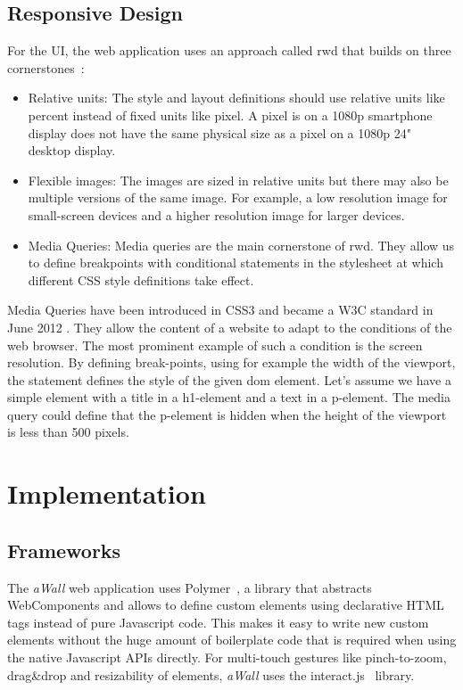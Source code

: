 \documentclass{sigchi}
\begin{document}
\subsection{Responsive Design}
For the UI, the web application uses an approach called \gls{rwd} that builds on three cornerstones~\cite{Marcotte:2011}:
\begin{itemize}
	\item Relative units: The style and layout definitions should use relative units like percent instead of fixed units like pixel. A pixel is on a 1080p smartphone display does not have the same physical size as a pixel on a 1080p 24" desktop display. 
	
	\item Flexible images: The images are sized in relative units but there may also be multiple versions of the same image. For example, a low resolution image for small-screen devices and a higher resolution image for larger devices.
	
	\item Media Queries: Media queries are the main cornerstone of \gls{rwd}. They allow us to define breakpoints with conditional statements in the stylesheet at which different CSS style definitions take effect.
\end{itemize}

Media Queries have been introduced in CSS3 and became a W3C standard in June 2012 \cite{mediaqueriesW3C}.
They allow the content of a website to adapt to the conditions of the web browser.
The most prominent example of such a condition is the screen resolution.
By defining break-points, using for example the width of the viewport, the statement defines the style of the given \gls{dom} element.
Let's assume we have a simple element with a title in a h1-element and a text in a p-element.
The media query could define that the p-element is hidden when the height of the viewport is less than 500 pixels.


\section{Implementation}
\subsection{Frameworks}
The \textit{aWall} web application uses Polymer~\cite{polymer}, a library that abstracts WebComponents and allows to define custom elements using declarative HTML tags instead of pure Javascript code.
This makes it easy to write new custom elements without the huge amount of boilerplate code that is required when using the native Javascript APIs directly.
For multi-touch gestures like pinch-to-zoom, drag\&drop and resizability of elements, \textit{aWall} uses the interact.js~\cite{interactJs} library.
\end{document}
